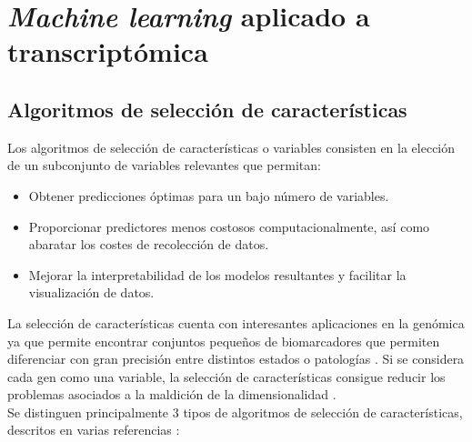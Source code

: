 \chapter{\textit{Machine learning} aplicado a transcriptómica}

\section{Algoritmos de selección de características}

Los algoritmos de selección de características o variables consisten en la elección de un subconjunto de variables relevantes que permitan:

\begin{itemize}
	\item Obtener predicciones óptimas para un bajo número de variables.
	\item Proporcionar predictores menos costosos computacionalmente, así como abaratar los costes de recolección de datos.
	\item Mejorar la interpretabilidad de los modelos resultantes y facilitar la visualización de datos.
\end{itemize} 

La selección de características cuenta con interesantes aplicaciones en la genómica ya que permite encontrar conjuntos pequeños de biomarcadores que permiten diferenciar con gran precisión entre distintos estados o patologías \cite{Xing, Tadist2019}. Si se considera cada gen como una variable, la selección de características consigue reducir los problemas asociados a la maldición de la dimensionalidad \cite{Bellman1957, Bellman1961}. \\

Se distinguen principalmente 3 tipos de algoritmos de selección de características, descritos en varias referencias \cite{HerreraMaldonado2020, Tadist2019}:

